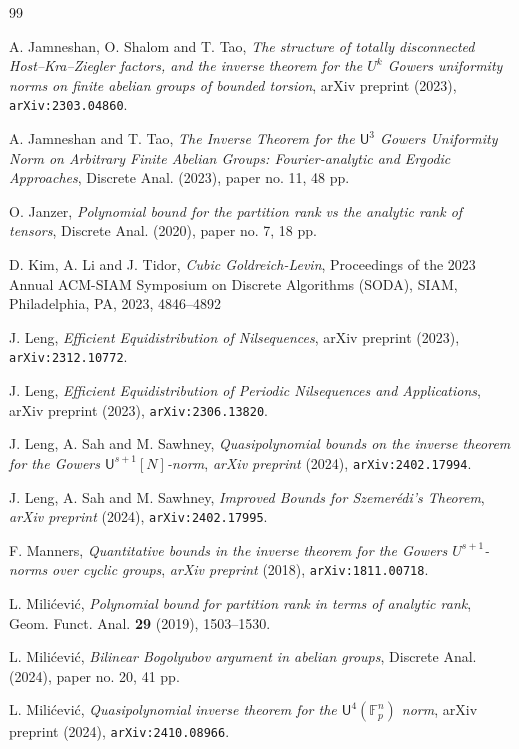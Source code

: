 \documentclass[a4paper,11pt]{article}
\numberwithin{theorem}{section}
\theoremstyle{definition}
\renewenvironment{thebibliography}[1]
{
  \begin{oldthebibliography}{#1}
    \setlength{\itemsep}{0em  plus 0.3ex}
    \setlength{\parskip}{0em}
}
{
  \end{oldthebibliography}
}
\begin{document}
\begin{thebibliography}{99}
 A. Jamneshan, O. Shalom and T. Tao, \textit{The structure of totally disconnected Host--Kra--Ziegler factors, and the inverse theorem for the $U^k$ Gowers uniformity norms on finite abelian groups of bounded torsion}, arXiv preprint (2023), \verb+arXiv:2303.04860+.

 A. Jamneshan and T. Tao, \textit{The Inverse Theorem for the $\mathsf{U}^3$ Gowers Uniformity Norm on Arbitrary Finite Abelian Groups: Fourier-analytic and Ergodic Approaches}, Discrete Anal. (2023), paper no. 11, 48 pp.

 O. Janzer, \emph{Polynomial bound for the partition rank vs the analytic rank of tensors}, Discrete Anal. (2020), paper no. 7, 18 pp.

 D. Kim, A. Li and J. Tidor, \textit{Cubic Goldreich-Levin}, Proceedings of the 2023 Annual ACM-SIAM Symposium on Discrete Algorithms (SODA), SIAM, Philadelphia, PA, 2023, 4846--4892

 J. Leng, \textit{Efficient Equidistribution of Nilsequences}, arXiv preprint (2023), \verb+arXiv:2312.10772+.

 J. Leng, \textit{Efficient Equidistribution of Periodic Nilsequences and Applications}, arXiv preprint (2023), \verb+arXiv:2306.13820+.

 J. Leng, A. Sah and M. Sawhney, \textit{Quasipolynomial bounds on the inverse theorem for the Gowers $\mathsf{U}^{s+1}[N]$-norm}, \emph{arXiv preprint} (2024), \verb+arXiv:2402.17994+.

 J. Leng, A. Sah and M. Sawhney, \textit{Improved Bounds for Szemerédi's Theorem}, \emph{arXiv preprint} (2024), \verb+arXiv:2402.17995+.

 F. Manners, \textit{Quantitative bounds in the inverse theorem for the Gowers $U^{s+1}$-norms over cyclic groups}, \emph{arXiv preprint} (2018), \verb+arXiv:1811.00718+.

 L. Mili\'cevi\'c, \emph{Polynomial bound for partition rank in terms of analytic rank}, Geom. Funct. Anal. \textbf{29} (2019), 1503--1530.

 L. Mili\'cevi\'c, \textit{Bilinear Bogolyubov argument in abelian groups}, Discrete Anal. (2024), paper no. 20, 41 pp.

 L. Mili\'cevi\'c, \textit{Quasipolynomial inverse theorem for the $\mathsf{U}^4(\mathbb{F}_p^n)$ norm}, arXiv preprint (2024), \verb+arXiv:2410.08966+.


\end{thebibliography}
\end{document}
